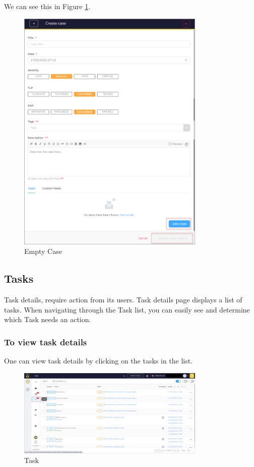 \documentclass{article}
\begin{document}
We can see this in Figure \ref{fig:emptycase}.
\begin{figure}[H]
    \centering
    \includegraphics[width=0.8\textwidth]{case3.png}
    \caption{Empty Case}
    \label{fig:emptycase}
\end{figure}

\subsection{Tasks}
Task details, require action from its users. Task details page displays a list of tasks. When navigating through the Task list, you can easily see and determine which Task needs an action.

\subsubsection*{To view task details}
One can view task details by clicking on the tasks in the list.\\

\begin{figure}[H]
    \centering
    \includegraphics[width=0.8\textwidth]{task1.png}
    \caption{Task}
    \label{fig:task}
\end{figure}
\end{document}
